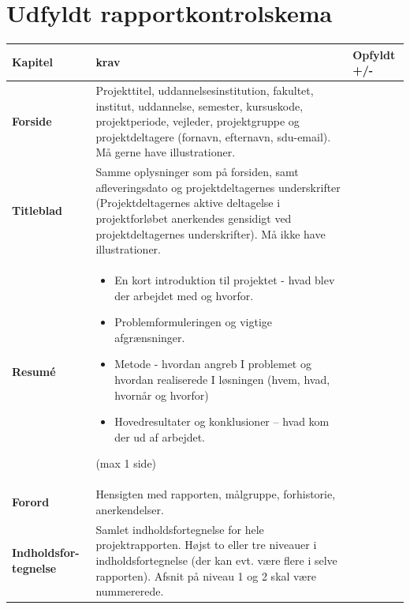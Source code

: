 \clearpage
\section{Udfyldt rapportkontrolskema}


\begin{longtable}{|p{30mm}|p{90mm}|p{25mm}|}
\hline
\textbf{Kapitel}    & \textbf{krav}     & \textbf{Opfyldt +/-} \\ \hline

\textbf{Forside}    & Projekttitel, uddannelsesinstitution, fakultet, institut, uddannelse, semester, kursuskode, projektperiode, vejleder, projektgruppe og projektdeltagere (fornavn, efternavn, sdu-email). Må gerne have illustrationer.
                                &           \\ \hline
                                        
\textbf{Titleblad}  & Samme oplysninger som på forsiden, samt afleveringsdato og projektdeltagernes underskrifter (Projektdeltagernes aktive deltagelse i projektforløbet anerkendes gensidigt ved projektdeltagernes underskrifter). Må ikke have illustrationer.
                                &           \\ \hline
                                        
\textbf{Resumé}     & \begin{itemize}
                        \item En kort introduktion til projektet - hvad blev der arbejdet med og hvorfor.
                        \item Problemformuleringen og vigtige afgrænsninger.
                        \item Metode - hvordan angreb I problemet og hvordan realiserede I løsningen (hvem, hvad, hvornår og hvorfor)
                        \item Hovedresultater og konklusioner  – hvad kom der ud af arbejdet.
                    \end{itemize}
                        (max 1 side)
                                &           \\ \hline

\textbf{Forord}     & Hensigten med rapporten, målgruppe, forhistorie, anerkendelser.
                                &           \\ \hline

\textbf{Indholdsfor-tegnelse}    & Samlet indholdsfortegnelse for hele projektrapporten. 
Højst to eller tre niveauer i indholdsfortegnelse (der kan evt. være flere i selve rapporten). Afsnit på niveau 1 og 2 skal være nummererede.
                                &           \\ \hline


\end{longtable}
